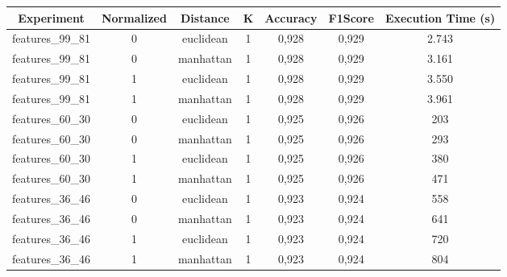 \documentclass[12pt]{article}
\begin{document}
\begin{table}[!htb]
  \centering
  \begin{tabular}{|c|c|c|c|c|c|c|}
  \hline
  \textbf{Experiment} & \textbf{Normalized} & \textbf{Distance} & \textbf{K} & \textbf{Accuracy} & \textbf{F1Score} & \textbf{Execution Time (s)} \\ \hline
  features\_99\_81    & 0                   & euclidean         & 1          & 0,928             & 0,929            & 2.743                       \\ \hline
  features\_99\_81    & 0                   & manhattan         & 1          & 0,928             & 0,929            & 3.161                       \\ \hline
  features\_99\_81    & 1                   & euclidean         & 1          & 0,928             & 0,929            & 3.550                       \\ \hline
  features\_99\_81    & 1                   & manhattan         & 1          & 0,928             & 0,929            & 3.961                       \\ \hline
  features\_60\_30    & 0                   & euclidean         & 1          & 0,925             & 0,926            & 203                         \\ \hline
  features\_60\_30    & 0                   & manhattan         & 1          & 0,925             & 0,926            & 293                         \\ \hline
  features\_60\_30    & 1                   & euclidean         & 1          & 0,925             & 0,926            & 380                         \\ \hline
  features\_60\_30    & 1                   & manhattan         & 1          & 0,925             & 0,926            & 471                         \\ \hline
  features\_36\_46    & 0                   & euclidean         & 1          & 0,923             & 0,924            & 558                         \\ \hline
  features\_36\_46    & 0                   & manhattan         & 1          & 0,923             & 0,924            & 641                         \\ \hline
  features\_36\_46    & 1                   & euclidean         & 1          & 0,923             & 0,924            & 720                         \\ \hline
  features\_36\_46    & 1                   & manhattan         & 1          & 0,923             & 0,924            & 804                         \\ \hline

\end{tabular}
\end{table}
\end{document}
